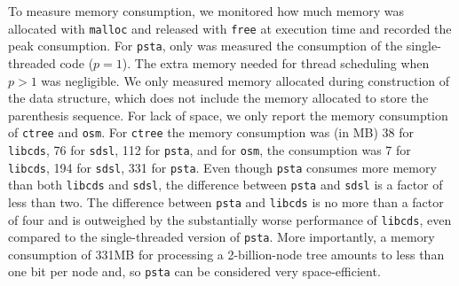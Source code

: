 %
To measure memory consumption, we monitored how much memory was allocated with
\texttt{malloc} and released with \texttt{free} at execution time and
recorded the peak consumption. For {\tt psta}, only was measured the consumption of
the single-threaded code ($p = 1$). The extra memory needed
for thread scheduling when $p > 1$ was negligible. We only measured memory allocated
during construction of the data structure, which does not include the
memory allocated to store the parenthesis sequence. For lack of space, we only
report the memory consumption of {\tt ctree} and {\tt osm}. For {\tt ctree}
the memory consumption was (in MB) 38 for {\tt libcds}, 76 for {\tt sdsl}, 112 for {\tt psta},
and for {\tt osm}, the consumption was 7 for {\tt libcds}, 194 for {\tt sdsl}, 331 for {\tt psta}.
Even though {\tt psta} consumes more memory than both {\tt libcds} and {\tt sdsl},
the difference between {\tt psta} and {\tt sdsl} is a factor of less
than two. The difference between {\tt psta} and {\tt libcds} is no
more than a factor of four and is outweighed by the substantially
worse performance of {\tt libcds}, even compared to the
single-threaded version of {\tt psta}.  More importantly, a memory
consumption of 331MB for processing a 2-billion-node tree amounts to
less than one bit per node and, so {\tt psta} can be considered very
space-efficient.

